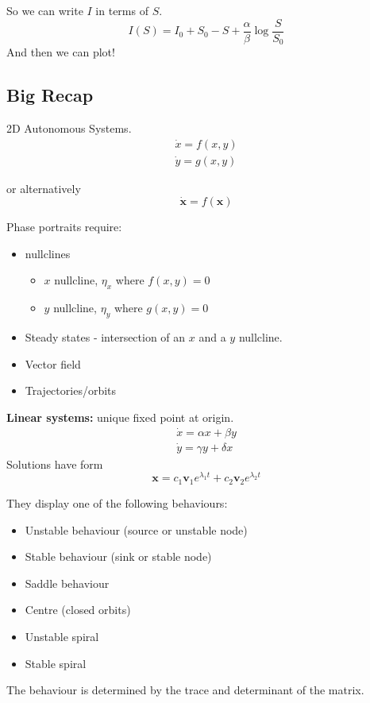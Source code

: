 \documentclass{/home/janmebows/Documents/LatexTemplates/myassignment}
\begin{document}
So we can write $I$ in terms of $S$.
\[I(S) = I_0 + S_0 - S + \frac{\alpha}{\beta} \log \frac{S}{S_0}\]
And then we can plot!


\subsection{Big Recap}
2D Autonomous Systems.
\begin{align*}
    \dot{x} = f(x,y)\\
    \dot{y} = g(x,y)
\end{align*}

or alternatively
\[\dot{\mathbf{x}} = f(\mathbf{x})\]

Phase portraits require: 
\begin{itemize}
    \item nullclines 
    \begin{itemize}
         \item $x$ nullcline, $\eta_x$ where $f(x,y) = 0$
         \item $y$ nullcline, $\eta_y$ where $g(x,y) = 0$
     \end{itemize} 
     \item Steady states - intersection of an $x$ and a $y$ nullcline.
     \item Vector field
     \item Trajectories/orbits
\end{itemize}

\textbf{Linear systems:} unique fixed point at origin.
\begin{align*}
    \dot{x} = \alpha x + \beta y\\
    \dot{y} = \gamma y + \delta x
\end{align*}
Solutions have form
\[\mathbf{x} = c_1 \mathbf{v}_1 e^{\lambda_1 t} + c_2 \mathbf{v}_2 e^{\lambda_2 t}\]

They display one of the following behaviours:
\begin{itemize}
    \item Unstable behaviour (source or unstable node) 
    \item Stable behaviour (sink or stable node)
    \item Saddle behaviour
    \item Centre (closed orbits)
    \item Unstable spiral
    \item Stable spiral
\end{itemize}

The behaviour is determined by the trace and determinant of the matrix.
\end{document}
